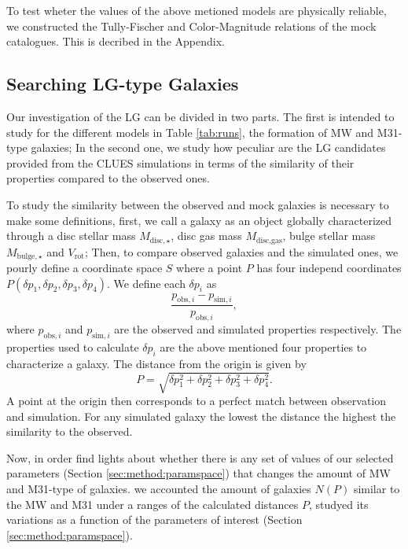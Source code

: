 \documentclass[usenatbib]{mn2e}
\begin{document}
To test wheter the values of the above metioned models are physically
reliable, we constructed the Tully-Fischer and Color-Magnitude
relations of the mock catalogues. This is decribed in the Appendix. 




\subsection{Searching LG-type Galaxies}
\label{sec:method:finding-lg}
Our investigation of the LG can be divided in two parts. The first is intended to study  for the  different models in Table \ref{tab:runs}, the formation
of MW  and M31-type galaxies; In the second one, we study how peculiar are the LG candidates provided from the CLUES simulations in terms of the similarity
of their properties compared to the observed ones.


To study the similarity between the observed and  mock galaxies is necessary to make some definitions, first, we call a galaxy as an object globally characterized 
through a disc stellar mass $M_{\text{disc},\star}$,  disc gas mass $M_{\text{disc,gas}}$, bulge stellar mass $M_{\text{bulge},\star}$  and  $V_{\text{rot}}$; Then, to
compare  observed galaxies and  the simulated ones, we pourly define a coordinate space $S$ where a point $P$ has four independ coordinates 
$P(\delta p_1, \delta p_2,\delta p_3,\delta p_4)$.  We define each $\delta p_i$ as
\begin{equation}
\frac{p_{\text{obs},i}-p_{\text{sim},i}}{p_{\text{obs},i}},
\end{equation}
where $p_{\text{obs},i}$ and $p_{\text{sim},i}$ are the observed and simulated properties respectively. The properties used to calculate $\delta p_i$ are the above
mentioned four properties to characterize a galaxy. The distance from the origin is given by
\begin{equation}
 P = \sqrt{\delta p^2_1 + \delta p^2_2 + \delta p^2_3 + \delta p^2_4}.\label{eq:relative_error}
\end{equation}
A point at the origin then corresponds to a perfect match between observation and simulation. For any simulated galaxy the lowest the distance the highest the 
similarity to the observed.


Now, in order find lights about whether there is any set of values of our selected parameters (Section \ref{sec:method:paramspace}) that
changes the amount of MW and M31-type of galaxies. we accounted the amount of galaxies $N( P)$ similar to the MW and M31 under a ranges 
of the calculated distances  $P$, studyed its variations as a function of the parameters of interest (Section \ref{sec:method:paramspace}).
 
\end{document}
